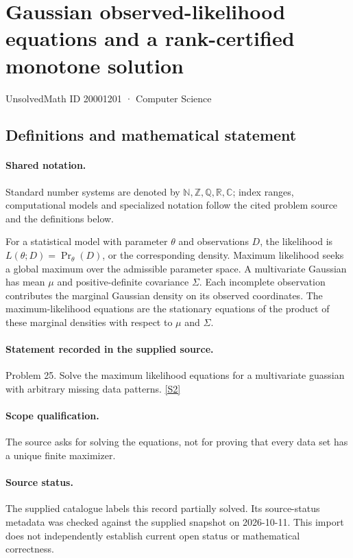 \documentclass[11pt]{article}
\newcommand{\sref}[2]{\hyperlink{source:#1:#2}{[S#2]}}
\begin{document}
\setcounter{section}{20001200}
\section{Gaussian observed-likelihood equations and a rank-certified monotone solution}\label{20001201}
{\small\sffamily UnsolvedMath ID 20001201 · Computer Science}
\subsection{Definitions and mathematical statement}

\paragraph{Shared notation.}Standard number systems are denoted by $\mathbb N,\mathbb Z,\mathbb Q,\mathbb R,\mathbb C$; index ranges, computational models and specialized notation follow the cited problem source and the definitions below.


For a statistical model with parameter $\theta$ and observations $D$, the likelihood is $L(\theta;D)=\Pr_\theta(D)$, or the corresponding density. Maximum likelihood seeks a global maximum over the admissible parameter space. A multivariate Gaussian has mean $\mu$ and positive-definite covariance $\Sigma$. Each incomplete observation contributes the marginal Gaussian density on its observed coordinates. The maximum-likelihood equations are the stationary equations of the product of these marginal densities with respect to $\mu$ and $\Sigma$.
\paragraph{Statement recorded in the supplied source.}
Problem 25. Solve the maximum likelihood equations for a multivariate guassian with arbitrary missing data patterns. \sref{20001201}{2}
\paragraph{Scope qualification.}
The source asks for solving the equations, not for proving that every data set has a unique finite maximizer.
\paragraph{Source status.}
The supplied catalogue labels this record partially solved. Its source-status metadata was checked against the supplied snapshot on 2026-10-11. This import does not independently establish current open status or mathematical correctness.
\end{document}
